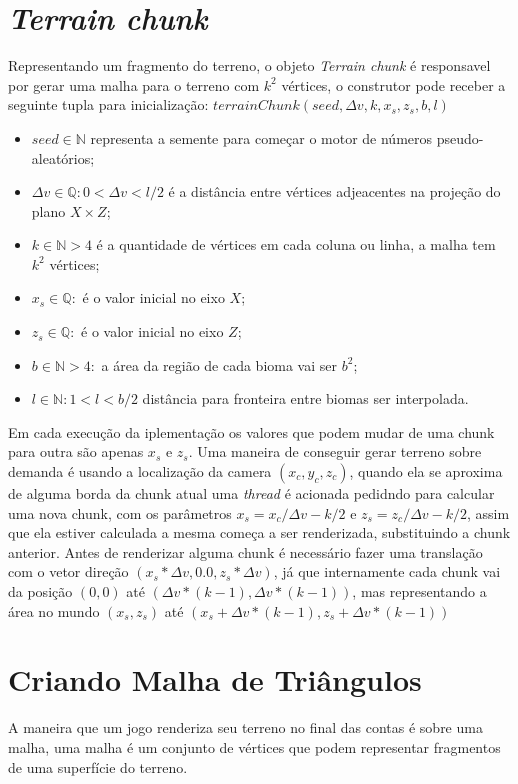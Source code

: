 \section{\textit{Terrain chunk}}
Representando um fragmento do terreno, o objeto \textit{Terrain chunk} é responsavel
por gerar uma malha para o terreno com $k^2$ vértices, o construtor pode receber 
a seguinte tupla para inicialização: 
$terrainChunk(seed, \Delta{v}, k, x_{s}, z_{s}, b, l)$
\begin{itemize}
    \item $seed \in \mathbb{N}$ representa a semente para começar o motor de números
    pseudo-aleatórios;
    \item $\Delta{v} \in \mathbb{Q}:0 < \Delta{v} < l/2$ é a distância entre vértices adjeacentes na
    projeção do plano $X \times Z$;
    \item $k \in \mathbb{N}>4$ é a quantidade de vértices em cada coluna ou 
    linha, a malha tem $k^2$ vértices;
    \item $x_{s} \in \mathbb{Q}:$ é o valor inicial no eixo $X$;
    \item $z_{s} \in \mathbb{Q}:$ é o valor inicial no eixo $Z$;
    \item $b \in \mathbb{N}>4:$ a área da região de cada bioma vai ser $b^2$;
    \item $l \in \mathbb{N}:1 < l < b/2$ distância para fronteira entre biomas ser interpolada.
\end{itemize}


Em cada execução da iplementação os valores que podem mudar de uma chunk para 
outra são apenas $x_{s}$ e $z_{s}$. Uma maneira de conseguir gerar terreno sobre demanda
é usando a localização da camera $(x_{c}, y_{c}, z_{c})$, quando ela se
aproxima de alguma borda da chunk atual
uma \textit{thread} é acionada pedidndo para calcular uma nova chunk, com os parâmetros
$x_{s} = x_{c}/\Delta{v} - k/2$ e $z_{s} = z_{c}/\Delta{v} - k/2$, assim que ela
estiver calculada a mesma começa a ser renderizada, substituindo a chunk anterior.
Antes de renderizar alguma chunk é necessário fazer uma translação com o vetor direção 
$(x_{s} * \Delta{v}, 0.0, z_{s} * \Delta{v})$, já que internamente cada chunk vai 
da posição $(0, 0)$ até $(\Delta{v}*(k-1), \Delta{v}*(k-1))$, mas representando a área 
no mundo $(x_{s}, z_{s})$ até $(x_{s} + \Delta{v}*(k-1), z_{s} + \Delta{v}*(k-1))$

\section{Criando Malha de Triângulos}
A maneira que um jogo renderiza seu terreno no final das contas é sobre uma
malha, uma malha é um conjunto de vértices que podem representar fragmentos
de uma superfície do terreno.

